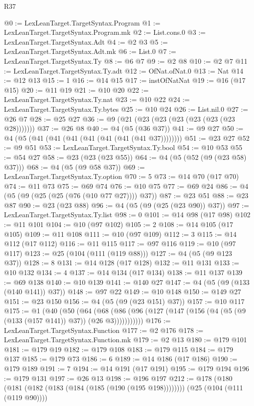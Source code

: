 \begin{lexlean}{R37}
\begin{coremodule}
@0 := LexLeanTarget.TargetSyntax.Program
@1 := LexLeanTarget.TargetSyntax.Program.mk
@2 := List.cons.{0}
@3 := LexLeanTarget.TargetSyntax.Adt
@4 := @2 @3
@5 := LexLeanTarget.TargetSyntax.Adt.mk
@6 := List.{0}
@7 := LexLeanTarget.TargetSyntax.Ty
@8 := @6 @7
@9 := @2 @8
@10 := @2 @7
@11 := LexLeanTarget.TargetSyntax.Ty.adt
@12 := OfNat.ofNat.{0}
@13 := Nat
@14 := @12 @13
@15 := 1
@16 := @14 @15
@17 := instOfNatNat
@19 := @16 (@17 @15)
@20 := @11 @19
@21 := @10 @20
@22 := LexLeanTarget.TargetSyntax.Ty.nat
@23 := @10 @22
@24 := LexLeanTarget.TargetSyntax.Ty.bytes
@25 := @10 @24
@26 := List.nil.{0}
@27 := @26 @7
@28 := @25 @27
@36 := @9 (@21 (@23 (@23 (@23 (@23 (@23 (@23 @28)))))))
@37 := @26 @8
@40 := @4 (@5 (@36 @37))
@41 := @9 @27
@50 := @4 (@5 (@41 (@41 (@41 (@41 (@41 (@41 (@41 @37))))))))
@51 := @23 @27
@52 := @9 @51
@53 := LexLeanTarget.TargetSyntax.Ty.bool
@54 := @10 @53
@55 := @54 @27
@58 := @23 (@23 (@23 @55))
@64 := @4 (@5 (@52 (@9 (@23 @58) @37)))
@68 := @4 (@5 (@9 @58 @37))
@69 := LexLeanTarget.TargetSyntax.Ty.option
@70 := 5
@73 := @14 @70 (@17 @70)
@74 := @11 @73
@75 := @69 @74
@76 := @10 @75
@77 := @69 @24
@86 := @4 (@5 (@9 (@25 (@25 (@76 (@10 @77 @27)))) @37))
@87 := @23 @51
@88 := @23 @87
@90 := @23 (@23 @88)
@96 := @4 (@5 (@9 (@25 (@23 @90)) @37))
@97 := LexLeanTarget.TargetSyntax.Ty.list
@98 := 0
@101 := @14 @98 (@17 @98)
@102 := @11 @101
@104 := @10 (@97 @102)
@105 := 2
@108 := @14 @105 (@17 @105)
@109 := @11 @108
@111 := @10 (@97 @109)
@112 := 3
@115 := @14 @112 (@17 @112)
@116 := @11 @115
@117 := @97 @116
@119 := @10 (@97 @117)
@123 := @25 (@104 (@111 (@119 @88)))
@127 := @4 (@5 (@9 @123 @37))
@128 := 8
@131 := @14 @128 (@17 @128)
@132 := @11 @131
@133 := @10 @132
@134 := 4
@137 := @14 @134 (@17 @134)
@138 := @11 @137
@139 := @69 @138
@140 := @10 @139
@141 := @140 @27
@147 := @4 (@5 (@9 (@133 (@140 @141)) @37))
@148 := @97 @22
@149 := @10 @148
@150 := @149 @27
@151 := @23 @150
@156 := @4 (@5 (@9 (@23 @151) @37))
@157 := @10 @117
@175 := @1
    (@40
      (@50
        (@64
          (@68 (@86 (@96 (@127 (@147 (@156 (@4 (@5 (@9 (@133 (@157 @141)) @37)) (@26 @3)))))))))))
@176 := LexLeanTarget.TargetSyntax.Function
@177 := @2 @176
@178 := LexLeanTarget.TargetSyntax.Function.mk
@179 := @2 @13
@180 := @179 @101
@181 := @179 @19
@182 := @179 @108
@183 := @179 @115
@184 := @179 @137
@185 := @179 @73
@186 := 6
@189 := @14 @186 (@17 @186)
@190 := @179 @189
@191 := 7
@194 := @14 @191 (@17 @191)
@195 := @179 @194
@196 := @179 @131
@197 := @26 @13
@198 := @196 @197
@212 := @178
    (@180 (@181 (@182 (@183 (@184 (@185 (@190 (@195 @198))))))))
    (@25 (@104 (@111 (@119 @90))))

\end{coremodule}
\end{lexlean}
